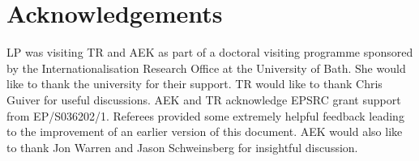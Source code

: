 \documentclass[12pt, leqno]{article}
\begin{document}
  




\section*{Acknowledgements}
LP was visiting TR and AEK as part of a doctoral visiting programme sponsored by the Internationalisation Research Office at the University of Bath. She would like to thank the university for their support. TR would like to thank Chris Guiver for useful discussions. AEK and TR acknowledge EPSRC grant support from  EP/S036202/1. Referees provided some extremely helpful feedback leading to the improvement of an earlier version of this document. AEK would also like to thank Jon Warren and Jason Schweinsberg for insightful discussion.


{}
%





\end{document}
